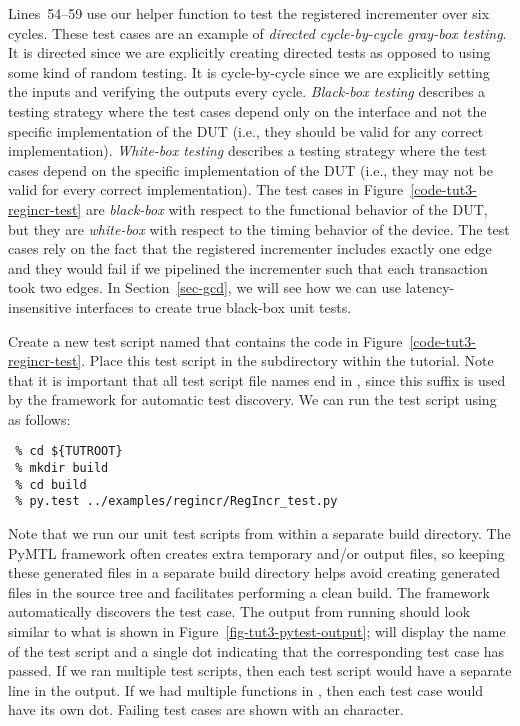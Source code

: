 \documentclass{cbxdoc}
\begin{document}
Lines~54--59 use our helper function to test the registered incrementer
over six cycles. These test cases are an example of \emph{directed
  cycle-by-cycle gray-box testing}. It is directed since we are
explicitly creating directed tests as opposed to using some kind of
random testing. It is cycle-by-cycle since we are explicitly setting the
inputs and verifying the outputs every cycle. \emph{Black-box testing}
describes a testing strategy where the test cases depend only on the
interface and not the specific implementation of the DUT (i.e., they
should be valid for any correct implementation). \emph{White-box testing}
describes a testing strategy where the test cases depend on the specific
implementation of the DUT (i.e., they may not be valid for every correct
implementation). The test cases in Figure~\ref{code-tut3-regincr-test}
are \emph{black-box} with respect to the functional behavior of the DUT,
but they are \emph{white-box} with respect to the timing behavior of the
device. The test cases rely on the fact that the registered incrementer
includes exactly one edge and they would fail if we pipelined the
incrementer such that each transaction took two edges. In
Section~\ref{sec-gcd}, we will see how we can use latency-insensitive
interfaces to create true black-box unit tests.

Create a new test script named  that contains the
code in Figure~\ref{code-tut3-regincr-test}. Place this test script in
the  subdirectory within the tutorial. Note that it
is important that all test script file names end in , since
this suffix is used by the  framework for automatic test
discovery. We can run the test script using  as follows:

\begin{verbatim}
 % cd ${TUTROOT}
 % mkdir build
 % cd build
 % py.test ../examples/regincr/RegIncr_test.py
\end{verbatim}



Note that we run our unit test scripts from within a separate build
directory. The PyMTL framework often creates extra temporary and/or
output files, so keeping these generated files in a separate build
directory helps avoid creating generated files in the source tree and
facilitates performing a clean build. The  framework
automatically discovers the  test case. The output from
running  should look similar to what is shown in
Figure~\ref{fig-tut3-pytest-output};  will display the name
of the test script and a single dot indicating that the corresponding
test case has passed. If we ran multiple test scripts, then each test
script would have a separate line in the output. If we had multiple
 functions in , then each test case would
have its own dot. Failing test cases are shown with an  character.
\end{document}
